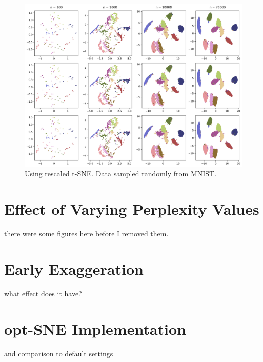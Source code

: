 \begin{figure}[h]
    \centering 
        \includegraphics[width=\linewidth]{figures/rescaled/MNIST_rescaled_embedding_grid.png}
        \caption{Using rescaled t-SNE. Data sampled randomly from MNIST.}
    \label{fig:MNIST-rescaled}
\end{figure}

\section{Effect of Varying Perplexity Values}
there were some figures here before I removed them. 

\section{Early Exaggeration}
what effect does it have? 

\section{opt-SNE Implementation}
and comparison to default settings 